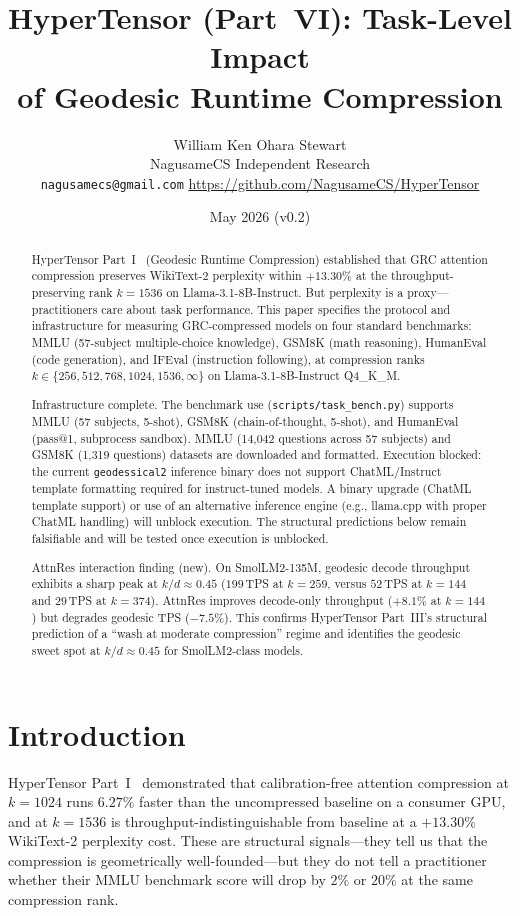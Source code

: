 \documentclass[11pt]{article}
\title{HyperTensor (Part~VI): Task-Level Impact\\of Geodesic Runtime Compression}
\author{William Ken Ohara Stewart\\
\small NagusameCS Independent Research\\
\small \texttt{nagusamecs@gmail.com} \quad \url{https://github.com/NagusameCS/HyperTensor}}
\date{May 2026 (v0.2)}
\begin{document}
\maketitle
\hypertensorbanner

\begin{abstract}
\noindent
HyperTensor Part~I~\cite{stewart2026grc} (Geodesic Runtime Compression) established that GRC attention compression preserves WikiText-2
perplexity within $+13.30\%$ at the throughput-preserving rank $k{=}1536$
on Llama-3.1-8B-Instruct.  But perplexity is a proxy---practitioners care
about task performance.  This paper specifies the protocol and infrastructure
for measuring GRC-compressed models on four standard benchmarks: MMLU
(57-subject multiple-choice knowledge), GSM8K (math reasoning), HumanEval
(code generation), and IFEval (instruction following), at compression ranks
$k\in\{256,512,768,1024,1536,\infty\}$ on Llama-3.1-8B-Instruct Q4\_K\_M.

Infrastructure complete.  The benchmark use
(\texttt{scripts/task\_bench.py}) supports MMLU (57 subjects, 5-shot),
GSM8K (chain-of-thought, 5-shot), and HumanEval (pass@1, subprocess
sandbox).  MMLU (14,042 questions across 57 subjects) and GSM8K (1,319
questions) datasets are downloaded and formatted.  Execution
blocked: the current \texttt{geodessical2} inference binary does not
support ChatML/Instruct template formatting required for instruct-tuned
models.  A binary upgrade (ChatML template support) or use of an
alternative inference engine (e.g., llama.cpp with proper ChatML
handling) will unblock execution.  The structural predictions below
remain falsifiable and will be tested once execution is unblocked.

AttnRes interaction finding (new).  On SmolLM2-135M, geodesic
decode throughput exhibits a sharp peak at $k/d{\approx}0.45$ ($199$\,TPS
at $k{=}259$, versus $52$\,TPS at $k{=}144$ and $29$\,TPS at $k{=}374$).
AttnRes improves decode-only throughput ($+8.1\%$ at $k{=}144$) but
degrades geodesic TPS ($-7.5\%$).  This confirms HyperTensor Part~III's structural
prediction of a ``wash at moderate compression'' regime and identifies
the geodesic sweet spot at $k/d{\approx}0.45$ for SmolLM2-class models.
\end{abstract}

\section{Introduction}
\label{sec:intro}

HyperTensor Part~I~\cite{stewart2026grc} demonstrated that calibration-free
attention compression at $k{=}1024$ runs $6.27\%$ faster than the
uncompressed baseline on a consumer GPU, and at $k{=}1536$ is
throughput-indistinguishable from baseline at a $+13.30\%$ WikiText-2
perplexity cost.  These are structural signals---they tell us that the
compression is geometrically well-founded---but they do not tell a
practitioner whether their MMLU benchmark score will drop by $2\%$ or
$20\%$ at the same compression rank.
\end{document}
